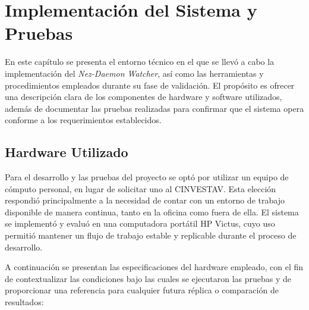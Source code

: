 \section{Implementación del Sistema y Pruebas}

En este capítulo se presenta el entorno técnico en el que se llevó a cabo la implementación del \textit{Nez-Daemon Watcher}, así como las herramientas y procedimientos empleados durante su fase de validación. El propósito es ofrecer una descripción clara de los componentes de hardware y software utilizados, además de documentar las pruebas realizadas para confirmar que el sistema opera conforme a los requerimientos establecidos.

\subsection{Hardware Utilizado}

Para el desarrollo y las pruebas del proyecto se optó por utilizar un equipo de cómputo personal, en lugar de solicitar uno al CINVESTAV. Esta elección respondió principalmente a la necesidad de contar con un entorno de trabajo disponible de manera continua, tanto en la oficina como fuera de ella. El sistema se implementó y evaluó en una computadora portátil HP Victus, cuyo uso permitió mantener un flujo de trabajo estable y replicable durante el proceso de desarrollo.

A continuación se presentan las especificaciones del hardware empleado, con el fin de contextualizar las condiciones bajo las cuales se ejecutaron las pruebas y de proporcionar una referencia para cualquier futura réplica o comparación de resultados:

